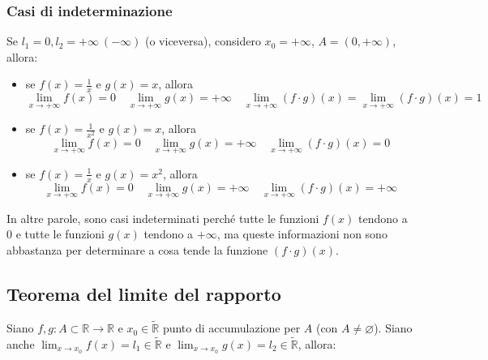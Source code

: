 \documentclass{article}
\begin{document}
\subsubsection{Casi di indeterminazione}
Se $l_1 = 0, l_2 = +\infty \ (-\infty)$ (o viceversa), considero $x_0 = + \infty$, $A = (0, +\infty)$, allora:

\begin{itemize}
    \item se $f(x) = \frac{1}{x}$ e $g(x) = x$, allora $$\lim_{x \to +\infty} f(x) = 0 \quad \lim_{x \to +\infty} g(x) = + \infty \quad \lim_{x \to +\infty} (f\cdot g)(x) = \lim_{x \to +\infty} (f\cdot g)(x) = 1$$
    \item se $f(x) = \frac{1}{x^2}$ e $g(x) = x$, allora $$\lim_{x \to +\infty} f(x) = 0 \quad \lim_{x \to +\infty} g(x) = +\infty \quad \lim_{x \to +\infty} (f\cdot g)(x) = 0$$
    \item se $f(x) = \frac{1}{x}$ e $g(x) = x^2$, allora $$\lim_{x \to +\infty} f(x) = 0 \quad \lim_{x \to +\infty} g(x) = + \infty \quad \lim_{x \to +\infty} (f \cdot g)(x) = +\infty$$
\end{itemize}

\noindent In altre parole, sono casi indeterminati perché tutte le funzioni $f(x)$ tendono a $0$ e tutte le funzioni $g(x)$ tendono a $+\infty$, ma queste informazioni non sono abbastanza per determinare a cosa tende la funzione $(f \cdot g)(x)$.

\subsection{Teorema del limite del rapporto}
 Siano $f, g: A \subset \mathbb{R} \xrightarrow{} \mathbb{R}$ e $x_0 \in \widetilde{\mathbb{R}}$ punto di accumulazione per $A$ (con $A \neq \varnothing$). Siano anche $\lim_{x \to x_0} f(x) = l_1 \in \widetilde{\mathbb{R}}$ e $\lim_{x \to x_0} g(x) = l_2 \in \widetilde{\mathbb{R}}$, allora:
\end{document}
